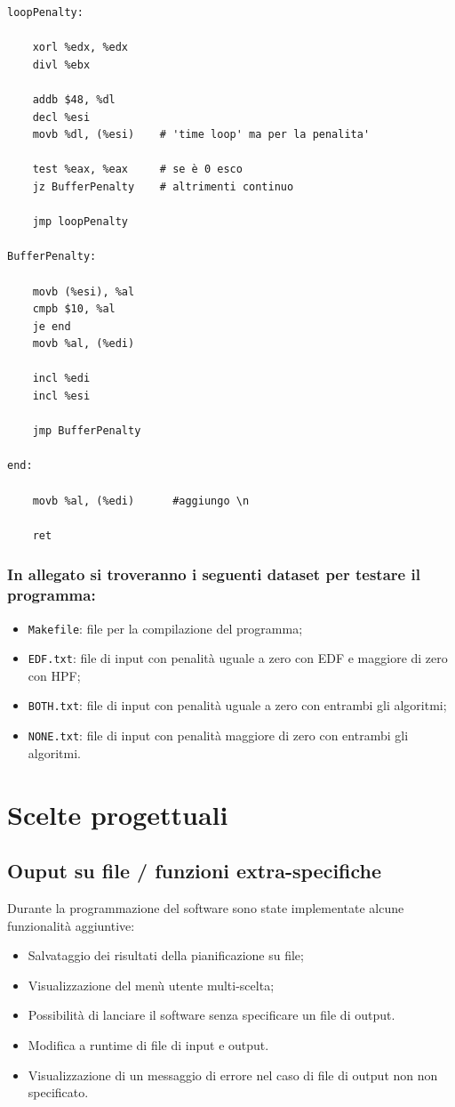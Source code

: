 \documentclass[a4paper]{report}
\begin{document}
\begin{itemize}
\begin{lstlisting}[firstnumber=130]
loopPenalty:

    xorl %edx, %edx
    divl %ebx

    addb $48, %dl
    decl %esi
    movb %dl, (%esi)    # 'time loop' ma per la penalita'

    test %eax, %eax     # se è 0 esco
    jz BufferPenalty    # altrimenti continuo

    jmp loopPenalty

BufferPenalty:

    movb (%esi), %al
    cmpb $10, %al
    je end
    movb %al, (%edi)

    incl %edi
    incl %esi

    jmp BufferPenalty

end:

    movb %al, (%edi)      #aggiungo \n
    
    ret

    \end{lstlisting}
    

  \end{itemize}

\subsubsection{In allegato si troveranno i seguenti dataset per testare il programma:}
\begin{itemize}
  \item \texttt{Makefile}: file per la compilazione del programma;
  \item \texttt{EDF.txt}: file di input con penalità uguale a zero con EDF e maggiore di zero con HPF;
  \item \texttt{BOTH.txt}: file di input con penalità uguale a zero con entrambi gli algoritmi;
  \item \texttt{NONE.txt}: file di input con penalità maggiore di zero con entrambi gli algoritmi.
\end{itemize}

\section{Scelte progettuali}

  \subsection{Ouput su file / funzioni extra-specifiche}
  Durante la programmazione del software sono state implementate alcune funzionalità aggiuntive:
    \begin{itemize}
      \item Salvataggio dei risultati della pianificazione su file;
      \item Visualizzazione del menù utente multi-scelta;
      \item Possibilità di lanciare il software senza specificare un file di output.
      \item Modifica a runtime di file di input e output.
      \item Visualizzazione di un messaggio di errore nel caso di file di output non non specificato.
    \end{itemize}
\end{document}
